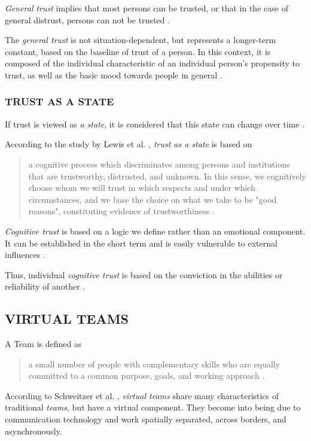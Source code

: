 \documentclass[sigchi]{acmart}
\begin{document}
\textit{General trust} implies that most persons can be trusted, or that in the case of general distrust, persons can not be trusted \citep{stolle2002trusting}.

The \textit{general trust} is not situation-dependent, but represents a longer-term constant, based on the baseline of trust of a person. In this context, it is composed of the individual characteristic of an individual person's propensity to trust, as well as the basic mood towards people in general \citep{couch1996assessment}.

\subsubsection{TRUST AS A STATE}
If trust is viewed as \textit{a state}, it is considered that this state can change over time \citep{mayer1995integrative}.

According to the study by Lewis et al. \citep[p. 970-971]{lewis1985trust}, \textit{trust as a state} is based on
\begin{quote} \grqq{}a cognitive process which discriminates among persons and institutions that are trustworthy, distrusted, and unknown. In this sense, we cognitively choose whom we will trust in which respects and under which circumstances, and we base the choice on what we take to be "good reasons", constituting evidence of trustworthiness\grqq{} \citep[p. 970]{lewis1985trust}.\end{quote}

\textit{Cognitive trust} is based on a logic we define rather than an emotional component. It can be established in the short term and is easily vulnerable to external influences \citep{lewis1985trust}. 

Thus, individual \textit{cognitive trust} is based on the conviction in the abilities or reliability of another \citep{mcallister1995affect}.

\subsection{VIRTUAL TEAMS}
A Team is defined as \begin{quote}\grqq{}a small number of people with complementary skills who are equally committed to a common purpose, goals, and working approach\grqq{} \citep[p. 718]{zenun2007effects}. \end{quote}

According to Schweitzer et al. \citep{schweitzer2010conceptualizing}, \textit{virtual teams} share many characteristics of traditional \textit{teams}, but have a virtual component.
They become into being due to communication technology and work spatially separated, across borders, and asynchronously.
\end{document}
